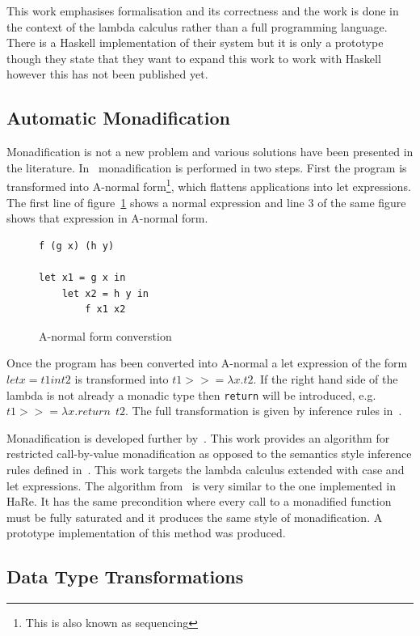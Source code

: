 This work emphasises formalisation and its correctness and the work is done in the context of the lambda calculus rather than a full programming language. There is a Haskell implementation of their system but it is only a prototype though they state that they want to expand this work to work with Haskell however this has not been published yet.

\subsection{Automatic Monadification}\label{erwigMonad}

Monadification is not a new problem and various solutions have been presented in the literature. In~\citep{lammelReuse} monadification is performed in two steps. First the program is transformed into A-normal form\footnote{This is also known as sequencing}, which flattens applications into let expressions. The first line of figure~\ref{anormal} shows a normal expression and line 3 of the same figure shows that expression in A-normal form.

\begin{figure}[t]
\begin{lstlisting}
f (g x) (h y)

let x1 = g x in
	let x2 = h y in
		f x1 x2
\end{lstlisting}
\caption{A-normal form converstion}
\label{anormal}
\end{figure}

Once the program has been converted into A-normal a let expression of the form $ let x = t1 in t2 $ is transformed into $ t1 >>= \lambda x. t2 $. If the right hand side of the lambda is not already a monadic type then \texttt{return} will be introduced, e.g. $ t1 >>= \lambda x. return~~t2 $. The full transformation is given by inference rules in~\citep{lammelReuse}.

Monadification is developed further by~\citep{monadification}. This work provides an algorithm for restricted call-by-value monadification as opposed to the semantics style inference rules defined in~\citep{lammelReuse}. This work targets the lambda calculus extended with case and let expressions. The algorithm from~\citep{monadification} is very similar to the one implemented in HaRe. It has the same precondition where every call to a monadified function must be fully saturated and it produces the same style of monadification. A prototype implementation of this method was produced.

\subsection{Data Type Transformations}\label{dtt}

